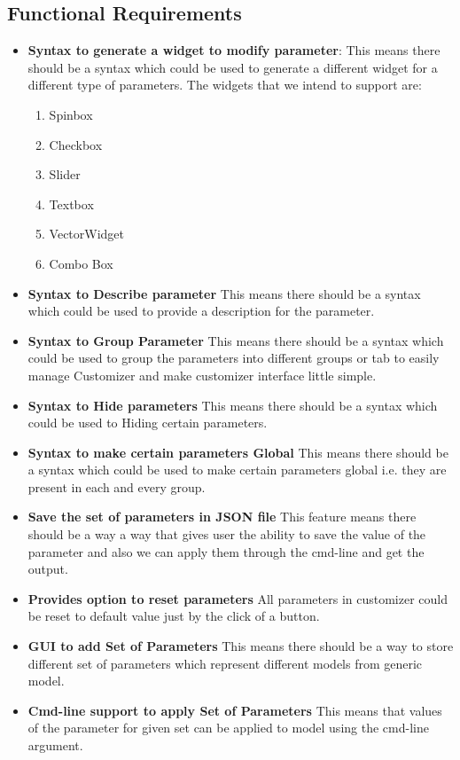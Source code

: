 \documentclass[12pt,includeheadfoot,a4paper]{report}
\let\Oldsubsection\subsection
\renewcommand{\subsection}{\FloatBarrier\Oldsubsection}
\begin{document}
\subsection{Functional Requirements}
\begin{itemize}
	\item {\bf Syntax to generate a widget to modify parameter}: This means there should be a syntax which could be used to generate a different widget for a different type of parameters.
	The widgets that we intend to support are:
	\begin{enumerate}
		\item Spinbox
		\item Checkbox
		\item Slider
		\item Textbox
		\item VectorWidget
		\item Combo Box
		
	\end{enumerate}
	\item {\bf Syntax to Describe parameter}
	This means there should be a syntax which could be used to provide a description for the parameter.
	\item \textbf{Syntax to Group Parameter}
	This means there should be a syntax which could be used to group the parameters into different groups or tab to easily manage Customizer and make customizer interface little simple.
	\item \textbf{Syntax to Hide parameters}
	This means there should be a syntax which could be used to Hiding certain parameters.
	\item \textbf{Syntax to make certain parameters Global}
	This means there should be a syntax which could be used to make certain parameters global i.e. they are present in each and every group.
	\item \textbf{Save the set of parameters in JSON file}
	This feature means there should be a way a way that gives user the ability to save the value of the parameter and also we can apply them through the cmd-line and get the output.
	
	\item\textbf{Provides option to reset parameters} All parameters in customizer could be reset to
	default value just by the click of a button.
	\item \textbf{GUI to add Set of Parameters}
	This means there should be a way to store different set of parameters which represent different models from generic model.
	\item \textbf{Cmd-line support to apply Set of Parameters} This means that values of
	the parameter for given set can be applied to model using the cmd-line argument.
\end{itemize}
\end{document}
